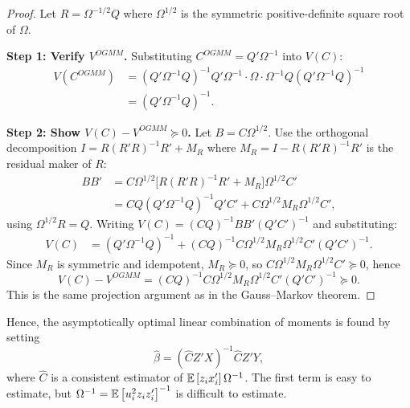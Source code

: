 \begin{proof}
	Let $R = \Omega^{-1/2}Q$ where $\Omega^{1/2}$ is the symmetric positive-definite square root of $\Omega$.

	\textbf{Step 1: Verify $V^{OGMM}$.} Substituting $C^{OGMM} = Q'\Omega^{-1}$ into $V(C)$:
	\begin{align*}
		V(C^{OGMM})
		&= (Q'\Omega^{-1}Q)^{-1}Q'\Omega^{-1}\cdot\Omega\cdot\Omega^{-1}Q(Q'\Omega^{-1}Q)^{-1} \\
		&= (Q'\Omega^{-1}Q)^{-1}
	.\end{align*}

	\textbf{Step 2: Show $V(C) - V^{OGMM} \succeq 0$.} Let $B = C\Omega^{1/2}$. Use the orthogonal decomposition $I = R(R'R)^{-1}R' + M_R$ where $M_R = I - R(R'R)^{-1}R'$ is the residual maker of $R$:
	\begin{align*}
		BB' &= C\Omega^{1/2}\bigl[R(R'R)^{-1}R' + M_R\bigr]\Omega^{1/2}C' \\
			&= CQ(Q'\Omega^{-1}Q)^{-1}Q'C' + C\Omega^{1/2}M_R\Omega^{1/2}C'
	,\end{align*}
	using $\Omega^{1/2}R = Q$. Writing $V(C) = (CQ)^{-1}BB'(Q'C')^{-1}$ and substituting:
	\begin{align*}
		V(C)
		&= (Q'\Omega^{-1}Q)^{-1} + (CQ)^{-1}C\Omega^{1/2}M_R\Omega^{1/2}C'(Q'C')^{-1}
	.\end{align*}
	Since $M_R$ is symmetric and idempotent, $M_R \succeq 0$, so $C\Omega^{1/2}M_R\Omega^{1/2}C' \succeq 0$, hence
	\[
		V(C) - V^{OGMM} = (CQ)^{-1}C\Omega^{1/2}M_R\Omega^{1/2}C'(Q'C')^{-1} \succeq 0
	.\]
	This is the same projection argument as in the Gauss--Markov theorem.
\end{proof}

Hence, the asymptotically optimal linear combination of moments is found by setting \[
	\hat{\beta} = \left( \hat{C} Z' X \right)^{-1} \hat{C} Z' Y
,\] where $\hat{C}$ is a consistent estimator of $\mathbb{E}\left[z_i x_i'\right] \Omega^{-1}$. The first term is easy to estimate, but $\Omega^{-1} = \mathbb{E}\left[u_i^2 z_i z_i'\right] ^{-1}$ is difficult to estimate.

